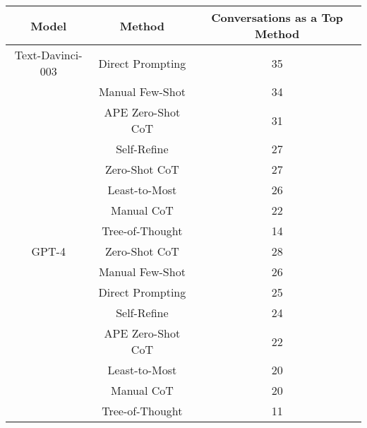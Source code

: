 \begin{tabular}{c c c}
\toprule
Model & Method & Conversations as a Top Method \\
\midrule
Text-Davinci-003 & Direct Prompting & 35 \\
 & Manual Few-Shot & 34 \\
 & APE Zero-Shot CoT & 31 \\
 & Self-Refine & 27 \\
 & Zero-Shot CoT & 27 \\
 & Least-to-Most & 26 \\
 & Manual CoT & 22 \\
 & Tree-of-Thought & 14 \\
GPT-4 & Zero-Shot CoT & 28 \\
 & Manual Few-Shot & 26 \\
 & Direct Prompting & 25 \\
 & Self-Refine & 24 \\
 & APE Zero-Shot CoT & 22 \\
 & Least-to-Most & 20 \\
 & Manual CoT & 20 \\
 & Tree-of-Thought & 11 \\
\bottomrule
\end{tabular}
